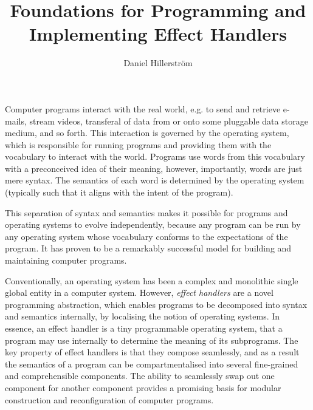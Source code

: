 \documentclass[12pt,phd,lfcs,twoside,openright,logo,leftchapter,normalheadings]{infthesis}
\title{Foundations for Programming and Implementing Effect Handlers}
\author{Daniel Hillerström}
\theoremstyle{plain}
\theoremstyle{definition}
\begin{document}
\raggedbottom
\begin{preliminary}

\maketitle

\begin{laysummary}
  Computer programs interact with the real world, e.g. to send and
  retrieve e-mails, stream videos, transferal of data from or onto
  some pluggable data storage medium, and so forth. This interaction
  is governed by the operating system, which is responsible for
  running programs and providing them with the vocabulary to interact
  with the world.
  Programs use words from this vocabulary with a preconceived idea of
  their meaning, however, importantly, words are just mere syntax. The
  semantics of each word is determined by the operating
  system (typically such that it aligns with the intent of the
  program).

  This separation of syntax and semantics makes it possible for
  programs and operating systems to evolve independently, because any
  program can be run by any operating system whose vocabulary conforms
  to the expectations of the program. It has proven to be a remarkably
  successful model for building and maintaining computer programs.

  Conventionally, an operating system has been a complex and
  monolithic single global entity in a computer system.
  However, \emph{effect handlers} are a novel programming abstraction,
  which enables programs to be decomposed into syntax and semantics
  internally, by localising the notion of operating systems. In
  essence, an effect handler is a tiny programmable operating system,
  that a program may use internally to determine the meaning of its
  subprograms. The key property of effect handlers is that they
  compose seamlessly, and as a result the semantics of a program can
  be compartmentalised into several fine-grained and comprehensible
  components. The ability to seamlessly swap out one component for
  another component provides a promising basis for modular
  construction and reconfiguration of computer programs.


\end{laysummary}
\end{preliminary}
\end{document}
